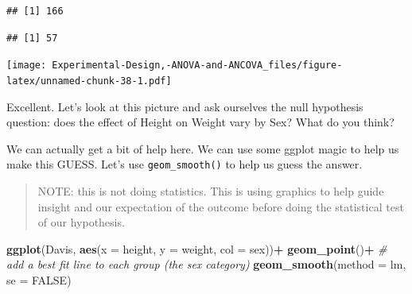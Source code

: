\documentclass[
]{book}
\newenvironment{Shaded}{\begin{snugshade}}{\end{snugshade}}
\newcommand{\AttributeTok}[1]{\textcolor[rgb]{0.13,0.29,0.53}{#1}}
\newcommand{\CommentTok}[1]{\textcolor[rgb]{0.56,0.35,0.01}{\textit{#1}}}
\newcommand{\ConstantTok}[1]{\textcolor[rgb]{0.56,0.35,0.01}{#1}}
\newcommand{\DecValTok}[1]{\textcolor[rgb]{0.00,0.00,0.81}{#1}}
\newcommand{\FunctionTok}[1]{\textcolor[rgb]{0.13,0.29,0.53}{\textbf{#1}}}
\newcommand{\NormalTok}[1]{#1}
\newcommand{\OtherTok}[1]{\textcolor[rgb]{0.56,0.35,0.01}{#1}}
\newcommand{\SpecialCharTok}[1]{\textcolor[rgb]{0.81,0.36,0.00}{\textbf{#1}}}
\begin{document}
\begin{verbatim}
## [1] 166
\end{verbatim}

\begin{Shaded}
\end{Shaded}

\begin{verbatim}
## [1] 57
\end{verbatim}

\begin{Shaded}
\end{Shaded}

\texttt{[image: Experimental-Design,-ANOVA-and-ANCOVA\_files/figure-latex/unnamed-chunk-38-1.pdf]}

Excellent. Let's look at this picture and ask ourselves the null hypothesis question: does the effect of Height on Weight vary by Sex? What do you think?

We can actually get a bit of help here. We can use some ggplot magic to help us make this GUESS. Let's use \texttt{geom\_smooth()} to help us guess the answer.

\begin{quote}
NOTE: this is not doing statistics. This is using graphics to help guide insight and our expectation of the outcome before doing the statistical test of our hypothesis.
\end{quote}

\begin{Shaded}
\begin{Highlighting}[]
\FunctionTok{ggplot}\NormalTok{(Davis, }\FunctionTok{aes}\NormalTok{(}\AttributeTok{x =}\NormalTok{ height, }\AttributeTok{y =}\NormalTok{ weight, }\AttributeTok{col =}\NormalTok{ sex))}\SpecialCharTok{+}
  \FunctionTok{geom\_point}\NormalTok{()}\SpecialCharTok{+}
  \CommentTok{\# add a best fit line to each group (the sex category)}
  \FunctionTok{geom\_smooth}\NormalTok{(}\AttributeTok{method =}\NormalTok{ lm, }\AttributeTok{se =} \ConstantTok{FALSE}\NormalTok{)}
\end{Highlighting}
\end{Shaded}
\end{document}
